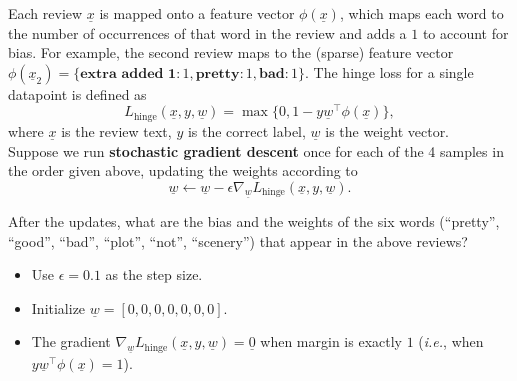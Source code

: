 \documentclass{article}
\theoremstyle{definition}
\begin{document}
\begin{question}[start=0]
		Each review $\underline{x}$ is mapped onto a feature vector $\phi(\underline{x})$, which maps each word to the number of occurrences of that word in the review and adds a $1$ to account for bias. For example, the second review maps to the (sparse) feature vector $\phi(\underline{x}_2)=\{\textbf{extra added 1}:1, \textbf{pretty}:1,\textbf{bad}:1\}$. The hinge loss for a single datapoint is defined as
		\begin{equation*}
			L_{\text{hinge}}(\underline{x}, y,\underline{w})= \max\{0, 1-y\underline{w}^\top\phi(\underline{x})\},
		\end{equation*}
		where $\underline{x}$ is the review text, $y$ is the correct label, $\underline{w}$ is the weight vector.\\

		Suppose we run \textbf{stochastic gradient descent} once for each of the 4 samples in the order given above, updating the weights according to
		\begin{equation*}
			\underline{w} \leftarrow \underline{w} - \epsilon \nabla_{\underline{w}} L_{\text{hinge}}(\underline{x}, y, \underline{w}).
		\end{equation*}
		
		After the updates, what are the bias and the weights of the six words (``pretty'', ``good'', ``bad'', ``plot'', ``not'', ``scenery'') that appear in the above reviews?
		\begin{itemize}
			\item Use $\epsilon=0.1$ as the step size.
			\item Initialize $\underline{w}=[0,0,0,0,0,0,0]$.
			\item The gradient $\nabla_{\underline{w}} L_{\text{hinge}}(\underline{x}, y, \underline{w})=\underline{0}$ when margin is exactly $1$ (\emph{i.e.}, when $y\underline{w}^\top\phi(\underline{x}) = 1$).
		\end{itemize}
		

\end{question}
\end{document}
